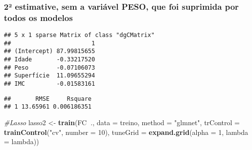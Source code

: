 \documentclass[]{article}
\newenvironment{Shaded}{\begin{snugshade}}{\end{snugshade}}
\newcommand{\CommentTok}[1]{\textcolor[rgb]{0.56,0.35,0.01}{\textit{#1}}}
\newcommand{\DataTypeTok}[1]{\textcolor[rgb]{0.13,0.29,0.53}{#1}}
\newcommand{\DecValTok}[1]{\textcolor[rgb]{0.00,0.00,0.81}{#1}}
\newcommand{\KeywordTok}[1]{\textcolor[rgb]{0.13,0.29,0.53}{\textbf{#1}}}
\newcommand{\NormalTok}[1]{#1}
\newcommand{\OperatorTok}[1]{\textcolor[rgb]{0.81,0.36,0.00}{\textbf{#1}}}
\newcommand{\StringTok}[1]{\textcolor[rgb]{0.31,0.60,0.02}{#1}}
\begin{document}
\hypertarget{estimative-sem-a-variuxe1vel-peso-que-foi-suprimida-por-todos-os-modelos}{%
\subsubsection{2² estimative, sem a variável PESO, que foi suprimida por
todos os
modelos}\label{estimative-sem-a-variuxe1vel-peso-que-foi-suprimida-por-todos-os-modelos}}

\begin{Shaded}
\end{Shaded}

\begin{verbatim}
## 5 x 1 sparse Matrix of class "dgCMatrix"
##                       1
## (Intercept) 87.99815655
## Idade       -0.33217520
## Peso        -0.07106073
## Superfície  11.09655294
## IMC         -0.01583161
\end{verbatim}

\begin{Shaded}
\end{Shaded}

\begin{verbatim}
##       RMSE     Rsquare
## 1 13.65961 0.006186351
\end{verbatim}

\begin{Shaded}
\begin{Highlighting}[]
\CommentTok{#Lasso}
\NormalTok{lasso2 <-}\StringTok{ }\KeywordTok{train}\NormalTok{(FC}\OperatorTok{~}\NormalTok{., }\DataTypeTok{data =}\NormalTok{ treino, }\DataTypeTok{method =} \StringTok{"glmnet"}\NormalTok{, }\DataTypeTok{trControl =} \KeywordTok{trainControl}\NormalTok{(}\StringTok{"cv"}\NormalTok{, }\DataTypeTok{number =} \DecValTok{10}\NormalTok{), }\DataTypeTok{tuneGrid =} \KeywordTok{expand.grid}\NormalTok{(}\DataTypeTok{alpha =} \DecValTok{1}\NormalTok{, }\DataTypeTok{lambda =}\NormalTok{ lambda))}
\end{Highlighting}
\end{Shaded}
\end{document}

